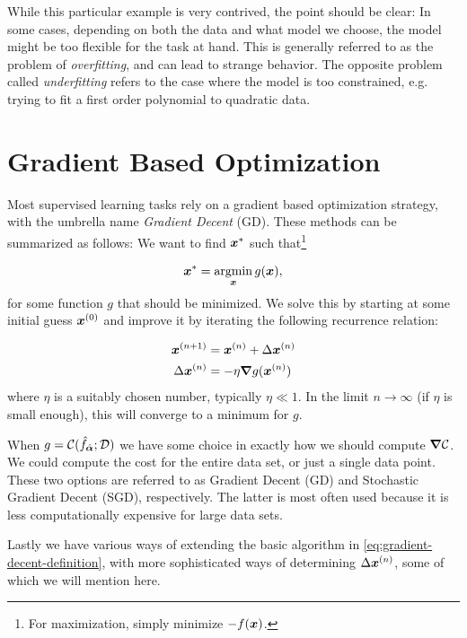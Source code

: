 \documentclass[Thesis.tex]{subfiles}
\begin{document}
While this particular example is very contrived, the point should be clear: In
some cases, depending on both the data and what model we choose, the model might
be too flexible for the task at hand. This is generally referred to as the
problem of \emph{overfitting}, and can lead to strange behavior. The opposite
problem called \emph{underfitting} refers to the case where the model is too
constrained, e.g. trying to fit a first order polynomial to
quadratic data.



\section{Gradient Based Optimization}
\label{sec:ml-optimization}

Most supervised learning tasks rely on a gradient based optimization strategy,
with the umbrella name \emph{Gradient Decent} (GD).
These methods can be summarized as follows: We want to find $\bm{x}^*$ such that\footnote{For maximization, simply minimize $-f(\bm{x})$. }

\begin{align}
  \bm{x}^* = \operatorname*{argmin}_{\bm{x}} g(\bm{x}),
\end{align}
for some function $g$ that should be minimized.
We solve this by starting at some initial guess $\bm{x}^{(0)}$ and improve it by
iterating the following recurrence relation:

\begin{align}
  \label{eq:gradient-decent-definition}
  \bm{x}^{(n+1)} &= \bm{x}^{(n)} + \Delta \bm{x}^{(n)} \\
  \Delta\bm{x}^{(n)} &= -\eta \grad{g}(\bm{x}^{(n)})
\end{align}
where $\eta$ is a suitably chosen number, typically $\eta \ll 1$. In the
limit $n\to\infty$ (if $\eta$ is small enough), this will converge to a minimum
for $g$.

When $g=\mathcal{C}(\hat f_{\hat{\bm{\alpha}}}; \mathcal{D})$ we have some choice in
exactly how we should compute $\grad{\mathcal{C}}$. We could compute the cost
for the entire data set, or just a single data point. These
two options are referred to as Gradient Decent (GD) and Stochastic Gradient
Decent (SGD), respectively. The latter is most often used because it is less
computationally expensive for large data sets.

Lastly we have various ways of extending the basic algorithm in
\cref{eq:gradient-decent-definition}, with more sophisticated ways of
determining $\Delta \bm{x}^{(n)}$, some of which we will mention here.
\end{document}
